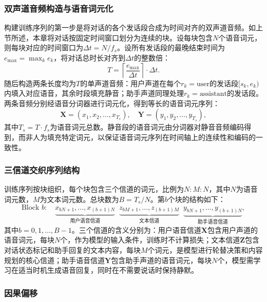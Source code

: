 \subsubsection{双声道音频构造与语音词元化}

构建训练序列的第一步是将对话的各个发话段合成为时间对齐的双声道音频。如上节所述，本章将对话按固定时间窗口划分为连续的块。设每块包含$N$个语音词元，则每块对应的时间窗口为$\Delta t = N / f_s$。设所有发话段的最晚结束时间为$e_{\max} = \max_k e_k$，将对话总时长对齐到$\Delta t$的整数倍：
\begin{equation}
    T = \left\lceil \frac{e_{\max}}{\Delta t} \right\rceil \cdot \Delta t.
\end{equation}
随后构造两条长度均为$T$的单声道音频：用户声道在每个$r_k = \text{user}$的发话段$[s_k, e_k)$内填入对应语音，其余时段填充静音；助手声道同理处理$r_k = \text{assistant}$的发话段。两条音频分别经语音分词器进行词元化，得到等长的语音词元序列：
\begin{equation}
    \mathbf{X} = (x_1, x_2, \ldots, x_{T_s}), \quad \mathbf{Y} = (y_1, y_2, \ldots, y_{T_s}),
\end{equation}
其中$T_s = T \cdot f_s$为语音词元总数。静音段的语音词元由分词器对静音音频编码得到，而非人为填充特定词元，以保证语音词元序列在时间轴上的连续性和编码的一致性。

\subsubsection{三信道交织序列结构}

训练序列按块组织，每个块包含三个信道的词元，比例为$N:M:N$，其中$N$为语音词元数，$M$为文本词元数。总块数为$B = T_s / N$。第$b$个块的结构如下：
\begin{equation}
    \text{Block } b: \quad \underbrace{x_{bN+1}, \ldots, x_{(b+1)N}}_{\text{用户语音信道}} \;\; \underbrace{z_{bM+1}, \ldots, z_{(b+1)M}}_{\text{文本信道}} \;\; \underbrace{y_{bN+1}, \ldots, y_{(b+1)N}}_{\text{助手语音信道}},
\end{equation}
其中$b = 0, 1, \ldots, B-1$。三个信道的含义分别为：用户语音信道$\mathbf{X}$包含用户声道的语音词元，每块$N$个，作为模型的输入条件，训练时不计算损失；文本信道$\mathbf{Z}$包含对话状态标记和助手回复的文本内容，每块$M$个词元，是模型进行轮替决策和内容规划的核心信道；助手语音信道$\mathbf{Y}$包含助手声道的语音词元，每块$N$个，模型需学习在适当时机生成语音回复，同时在不需要说话时保持静默。

\subsubsection{因果偏移}

